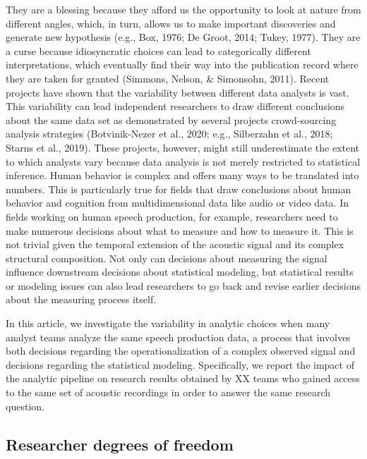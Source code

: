 \documentclass[
  english,
  man,floatsintext]{apa6}
\begin{document}
They are a blessing because they afford us the opportunity to look at nature from different angles, which, in turn, allows us to make important discoveries and generate new hypothesis (e.g., Box, 1976; De Groot, 2014; Tukey, 1977).
They are a curse because idiosyncratic choices can lead to categorically different interpretations, which eventually find their way into the publication record where they are taken for granted (Simmons, Nelson, \& Simonsohn, 2011).
Recent projects have shown that the variability between different data analysts is vast.
This variability can lead independent researchers to draw different conclusions about the same data set as demonstrated by several projects crowd-sourcing analysis strategies (Botvinik-Nezer et al., 2020; e.g., Silberzahn et al., 2018; Starns et al., 2019).
These projects, however, might still underestimate the extent to which analysts vary because data analysis is not merely restricted to statistical inference.
Human behavior is complex and offers many ways to be translated into numbers.
This is particularly true for fields that draw conclusions about human behavior and cognition from multidimensional data like audio or video data.
In fields working on human speech production, for example, researchers need to make numerous decisions about what to measure and how to measure it.
This is not trivial given the temporal extension of the acoustic signal and its complex structural composition.
Not only can decisions about measuring the signal influence downstream decisions about statistical modeling, but statistical results or modeling issues can also lead researchers to go back and revise earlier decisions about the measuring process itself.

In this article, we investigate the variability in analytic choices when many analyst teams analyze the same speech production data, a process that involves both decisions regarding the operationalization of a complex observed signal and decisions regarding the statistical modeling.
Specifically, we report the impact of the analytic pipeline on research results obtained by XX teams who gained access to the same set of acoustic recordings in order to answer the same research question.

\hypertarget{researcher-degrees-of-freedom}{%
\subsection{Researcher degrees of freedom}\label{researcher-degrees-of-freedom}}
\end{document}
